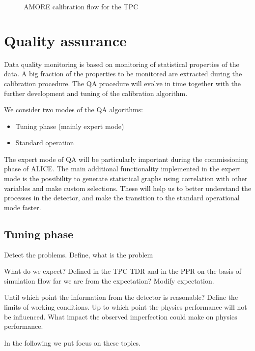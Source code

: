 \documentclass[a4paper,12pt]{article}
\begin{document}
\begin{figure}
  \centering{}
  \caption{AMORE calibration flow for the TPC}
  \label{amorefigure}
\end{figure}


\section{Quality assurance}

Data quality monitoring is based on monitoring of statistical properties of the
data. A big fraction of the properties to be monitored are extracted during the
calibration procedure.  The QA procedure will evolve in time together with the 
further development and tuning of the calibration algorithm.  

We consider two modes of the QA algorithms:

\begin{itemize}
 \item Tuning phase  (mainly expert mode)
 \item Standard operation 
\end{itemize}

The expert mode of QA will be particularly important during the commissioning phase 
of ALICE. The  main additional functionality implemented in the expert mode is 
the possibility to generate statistical graphs using correlation with other 
variables and make custom selections. These will help us to better understand 
the processes in the detector, and make the transition to the standard operational
mode faster.

   

\subsection{Tuning phase}

Detect the problems.
Define, what is the problem

What do we expect? 
Defined in the TPC TDR and in the PPR on the basis of simulation
How far we are from the expectation?
Modify expectation.

Until which point the information from the detector is reasonable?
Define the limits of working conditions.
Up to which point the physics performance will not be influenced.
What impact the observed imperfection could make on physics performance.

In the following we put focus on these topics.
\end{document}
